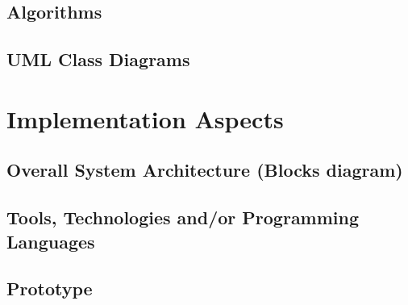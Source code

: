 \documentclass{book}
\begin{document}
		\section{Algorithms}
		
		\section{UML Class Diagrams}
	
	\chapter{Implementation Aspects}
		\section{Overall System Architecture (Blocks diagram)}
		
		\section{Tools, Technologies and/or Programming Languages}
		
		\section{Prototype}
	
\end{document}
